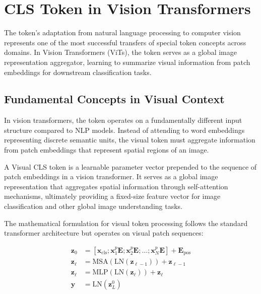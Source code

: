 
\section{CLS Token in Vision Transformers}

The \cls{} token's adaptation from natural language processing to computer vision represents one of the most successful transfers of special token concepts across domains. In Vision Transformers (ViTs), the \cls{} token serves as a global image representation aggregator, learning to summarize visual information from patch embeddings for downstream classification tasks.

\subsection{Fundamental Concepts in Visual Context}

In vision transformers, the \cls{} token operates on a fundamentally different input structure compared to NLP models. Instead of attending to word embeddings representing discrete semantic units, the visual \cls{} token must aggregate information from patch embeddings that represent spatial regions of an image.

\begin{definition}
A Visual CLS token is a learnable parameter vector prepended to the sequence of patch embeddings in a vision transformer. It serves as a global image representation that aggregates spatial information through self-attention mechanisms, ultimately providing a fixed-size feature vector for image classification and other global image understanding tasks.
\end{definition}

The mathematical formulation for visual \cls{} token processing follows the standard transformer architecture but operates on visual patch sequences:

\begin{align}
\mathbf{z}_0 &= [\mathbf{x}_{\text{cls}}; \mathbf{x}_1^p\mathbf{E}; \mathbf{x}_2^p\mathbf{E}; \ldots; \mathbf{x}_N^p\mathbf{E}] + \mathbf{E}_{\text{pos}} \\
\mathbf{z}_\ell &= \text{MSA}(\text{LN}(\mathbf{z}_{\ell-1})) + \mathbf{z}_{\ell-1} \\
\mathbf{z}_\ell &= \text{MLP}(\text{LN}(\mathbf{z}_\ell)) + \mathbf{z}_\ell \\
\mathbf{y} &= \text{LN}(\mathbf{z}_L^0)
\end{align}

